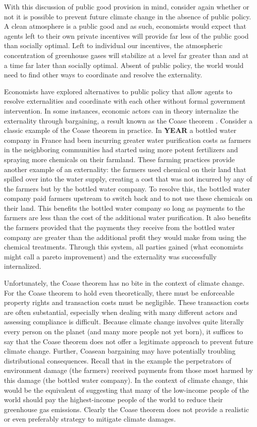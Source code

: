 With this discussion of public good provision in mind, consider again whether or not it is possible to prevent future climate change in the absence of public policy. A clean atmosphere is a public good and as such, economists would expect that agents left to their own private incentives will provide far less of the public good than socially optimal. Left to individual our incentives, the atmospheric concentration of greenhouse gases will stabilize at a level far greater than and at a time far later than socially optimal. Absent of public policy, the world would need to find other ways to coordinate and resolve the externality.

Economists have explored alternatives to public policy that allow agents to resolve externalities and coordinate with each other without formal government intervention. In some instances, economic actors can in theory internalize the externality through bargaining, a result known as the Coase theorem \citep{coase1960problem}. Consider a classic example of the Coase theorem in practice. In \textbf{YEAR} a bottled water company in France had been incurring greater water purification costs as farmers in the neighboring communities had started using more potent fertilizers and spraying more chemicals on their farmland. These farming practices provide another example of an externality: the farmers used chemical on their land that spilled over into the water supply, creating a cost that was not incurred by any of the farmers but by the bottled water company. To resolve this, the bottled water company paid farmers upstream to switch back and to not use these chemicals on their land. This benefits the bottled water company so long as payments to the farmers are less than the cost of the additional water purification. It also benefits the farmers provided that the payments they receive from the bottled water company are greater than the additional profit they would make from using the chemical treatments. Through this system, all parties gained (what economists might call a pareto improvement) and the externality was successfully internalized. 

Unfortunately, the Coase theorem has no bite in the context of climate change. For the Coase theorem to hold even theoretically, there must be enforceable property rights and transaction costs must be negligible. These transaction costs are often substantial, especially when dealing with many different actors and assessing compliance is difficult. Because climate change involves quite literally every person on the planet (and many more people not yet born), it suffices to say that the Coase theorem does not offer a legitimate approach to prevent future climate change. Further, Coasean bargaining may have potentially troubling distributional consequences. Recall that in the example the perpetrators of environment damage (the farmers) received payments from those most harmed by this damage (the bottled water company). In the context of climate change, this would be the equivalent of suggesting that many of the low-income people of the world should pay the highest-income people of the world to reduce their greenhouse gas emissions. Clearly the Coase theorem does not provide a realistic or even preferably strategy to mitigate climate damages. 


